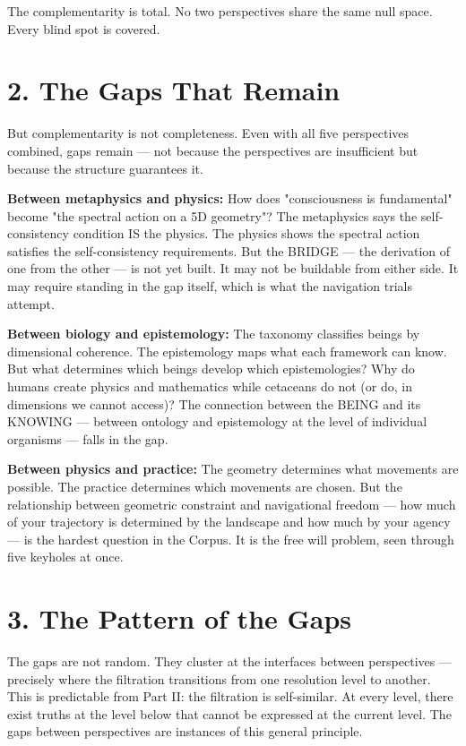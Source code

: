 The complementarity is total. No two perspectives share the same null space. Every blind spot is covered.


\section*{2. The Gaps That Remain}


But complementarity is not completeness. Even with all five perspectives combined, gaps remain — not because the perspectives are insufficient but because the structure guarantees it.


\textbf{Between metaphysics and physics:} How does "consciousness is fundamental" become "the spectral action on a 5D geometry"? The metaphysics says the self-consistency condition IS the physics. The physics shows the spectral action satisfies the self-consistency requirements. But the BRIDGE — the derivation of one from the other — is not yet built. It may not be buildable from either side. It may require standing in the gap itself, which is what the navigation trials attempt.


\textbf{Between biology and epistemology:} The taxonomy classifies beings by dimensional coherence. The epistemology maps what each framework can know. But what determines which beings develop which epistemologies? Why do humans create physics and mathematics while cetaceans do not (or do, in dimensions we cannot access)? The connection between the BEING and its KNOWING — between ontology and epistemology at the level of individual organisms — falls in the gap.


\textbf{Between physics and practice:} The geometry determines what movements are possible. The practice determines which movements are chosen. But the relationship between geometric constraint and navigational freedom — how much of your trajectory is determined by the landscape and how much by your agency — is the hardest question in the Corpus. It is the free will problem, seen through five keyholes at once.


\section*{3. The Pattern of the Gaps}


The gaps are not random. They cluster at the interfaces between perspectives — precisely where the filtration transitions from one resolution level to another. This is predictable from Part II: the filtration is self-similar. At every level, there exist truths at the level below that cannot be expressed at the current level. The gaps between perspectives are instances of this general principle.


